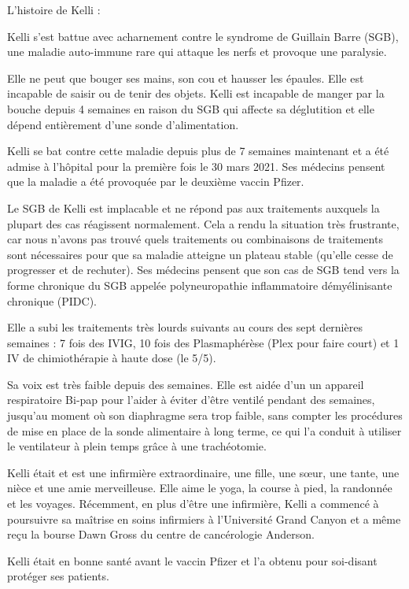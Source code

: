 L'histoire de Kelli :

Kelli s'est battue avec acharnement contre le syndrome de Guillain Barre (SGB),
une maladie auto-immune rare qui attaque les nerfs et provoque une paralysie.

Elle ne peut que bouger ses mains, son cou et hausser les épaules. Elle est
incapable de saisir ou de tenir des objets. Kelli est incapable de manger par la
bouche depuis 4 semaines en raison du SGB qui affecte sa déglutition et elle
dépend entièrement d'une sonde d'alimentation.

Kelli se bat contre cette maladie depuis plus de 7 semaines maintenant et a été
admise à l'hôpital pour la première fois le 30 mars 2021. Ses médecins pensent
que la maladie a été provoquée par le deuxième vaccin Pfizer.

Le SGB de Kelli est implacable et ne répond pas aux traitements auxquels la
plupart des cas réagissent normalement. Cela a rendu la situation très
frustrante, car nous n'avons pas trouvé quels traitements ou combinaisons de
traitements sont nécessaires pour que sa maladie atteigne un plateau stable
(qu'elle cesse de progresser et de rechuter). Ses médecins pensent que son cas
de SGB tend vers la forme chronique du SGB appelée polyneuropathie inflammatoire
démyélinisante chronique (PIDC).

Elle a subi les traitements très lourds suivants au cours des sept dernières
semaines : 7 fois des IVIG, 10 fois des Plasmaphérèse (Plex pour faire court) et
1 IV de chimiothérapie à haute dose (le 5/5).

Sa voix est très faible depuis des semaines. Elle est aidée d'un un appareil
respiratoire Bi-pap pour l'aider à éviter d'être ventilé pendant des semaines,
jusqu'au moment où son diaphragme sera trop faible, sans compter les procédures
de mise en place de la sonde alimentaire à long terme, ce qui l'a conduit à
utiliser le ventilateur à plein temps grâce à une trachéotomie.

Kelli était et est une infirmière extraordinaire, une fille, une sœur, une
tante, une nièce et une amie merveilleuse. Elle aime le yoga, la course à pied,
la randonnée et les voyages. Récemment, en plus d'être une infirmière, Kelli a
commencé à poursuivre sa maîtrise en soins infirmiers à l'Université Grand
Canyon et a même reçu la bourse Dawn Gross du centre de cancérologie Anderson.

Kelli était en bonne santé avant le vaccin Pfizer et l'a obtenu pour soi-disant
protéger ses patients.

